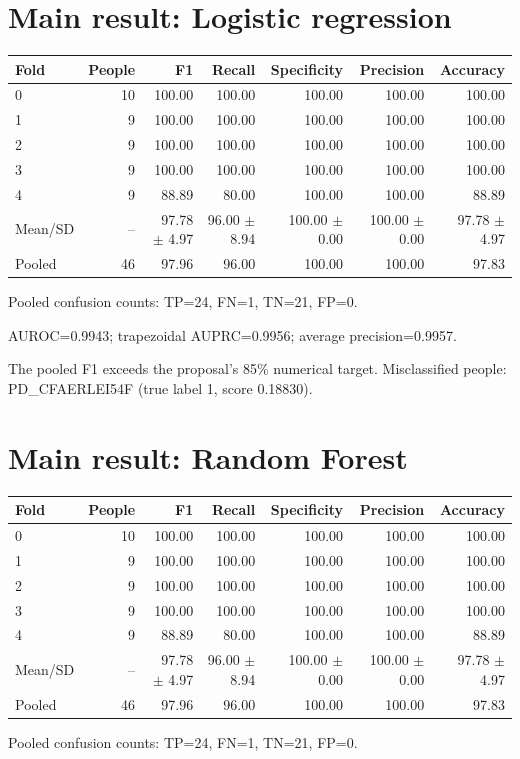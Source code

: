 \documentclass[11pt,a4paper]{article}
\begin{document}
\clearpage\section{Main result: Logistic regression}
\begin{center}\small\begin{tabular}{lrrrrrr}\toprule Fold & People & F1 & Recall & Specificity & Precision & Accuracy\\\midrule
0 & 10 & 100.00 & 100.00 & 100.00 & 100.00 & 100.00\\
1 & 9 & 100.00 & 100.00 & 100.00 & 100.00 & 100.00\\
2 & 9 & 100.00 & 100.00 & 100.00 & 100.00 & 100.00\\
3 & 9 & 100.00 & 100.00 & 100.00 & 100.00 & 100.00\\
4 & 9 & 88.89 & 80.00 & 100.00 & 100.00 & 88.89\\
Mean/SD & -- & 97.78 $\pm$ 4.97 & 96.00 $\pm$ 8.94 & 100.00 $\pm$ 0.00 & 100.00 $\pm$ 0.00 & 97.78 $\pm$ 4.97\\\midrule
Pooled & 46 & 97.96 & 96.00 & 100.00 & 100.00 & 97.83\\\bottomrule\end{tabular}\end{center}
Pooled confusion counts: TP=24, FN=1, TN=21, FP=0.

AUROC=0.9943; trapezoidal AUPRC=0.9956; average precision=0.9957.

The pooled F1 exceeds the proposal's 85\% numerical target. 
Misclassified people: PD\_CFAERLEI54F (true label 1, score 0.18830).

\clearpage\section{Main result: Random Forest}
\begin{center}\small\begin{tabular}{lrrrrrr}\toprule Fold & People & F1 & Recall & Specificity & Precision & Accuracy\\\midrule
0 & 10 & 100.00 & 100.00 & 100.00 & 100.00 & 100.00\\
1 & 9 & 100.00 & 100.00 & 100.00 & 100.00 & 100.00\\
2 & 9 & 100.00 & 100.00 & 100.00 & 100.00 & 100.00\\
3 & 9 & 100.00 & 100.00 & 100.00 & 100.00 & 100.00\\
4 & 9 & 88.89 & 80.00 & 100.00 & 100.00 & 88.89\\
Mean/SD & -- & 97.78 $\pm$ 4.97 & 96.00 $\pm$ 8.94 & 100.00 $\pm$ 0.00 & 100.00 $\pm$ 0.00 & 97.78 $\pm$ 4.97\\\midrule
Pooled & 46 & 97.96 & 96.00 & 100.00 & 100.00 & 97.83\\\bottomrule\end{tabular}\end{center}
Pooled confusion counts: TP=24, FN=1, TN=21, FP=0.
\end{document}
